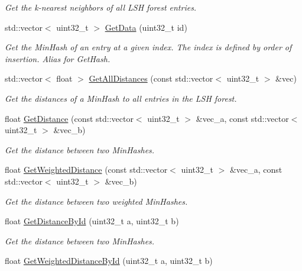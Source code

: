 \begin{DoxyCompactItemize}
\begin{DoxyCompactList}\small\item\em Get the k-\/nearest neighbors of all L\+SH forest entries. \end{DoxyCompactList}\item 
std\+::vector$<$ uint32\+\_\+t $>$ \hyperlink{classtmap_1_1LSHForest_ac4ec080057307f69548e6ca756ce5609}{Get\+Data} (uint32\+\_\+t id)
\begin{DoxyCompactList}\small\item\em Get the Min\+Hash of an entry at a given index. The index is defined by order of insertion. Alias for Get\+Hash. \end{DoxyCompactList}\item 
std\+::vector$<$ float $>$ \hyperlink{classtmap_1_1LSHForest_a438a46f67fb257ae85c3dd16e8b194df}{Get\+All\+Distances} (const std\+::vector$<$ uint32\+\_\+t $>$ \&vec)
\begin{DoxyCompactList}\small\item\em Get the distances of a Min\+Hash to all entries in the L\+SH forest. \end{DoxyCompactList}\item 
float \hyperlink{classtmap_1_1LSHForest_ab1c5e002deea04a625ab141f280bab92}{Get\+Distance} (const std\+::vector$<$ uint32\+\_\+t $>$ \&vec\+\_\+a, const std\+::vector$<$ uint32\+\_\+t $>$ \&vec\+\_\+b)
\begin{DoxyCompactList}\small\item\em Get the distance between two Min\+Hashes. \end{DoxyCompactList}\item 
float \hyperlink{classtmap_1_1LSHForest_aa6c035b27040909b3d7a8782ad1c63b8}{Get\+Weighted\+Distance} (const std\+::vector$<$ uint32\+\_\+t $>$ \&vec\+\_\+a, const std\+::vector$<$ uint32\+\_\+t $>$ \&vec\+\_\+b)
\begin{DoxyCompactList}\small\item\em Get the distance between two weighted Min\+Hashes. \end{DoxyCompactList}\item 
float \hyperlink{classtmap_1_1LSHForest_a8fc81622125b40114951a61cbe90863f}{Get\+Distance\+By\+Id} (uint32\+\_\+t a, uint32\+\_\+t b)
\begin{DoxyCompactList}\small\item\em Get the distance between two Min\+Hashes. \end{DoxyCompactList}\item 
float \hyperlink{classtmap_1_1LSHForest_ab00052289bb6bea152e6024049eebcc5}{Get\+Weighted\+Distance\+By\+Id} (uint32\+\_\+t a, uint32\+\_\+t b)

\end{DoxyCompactItemize}
